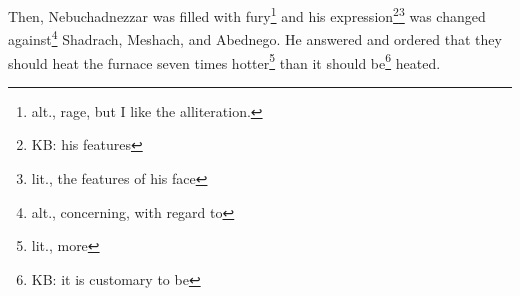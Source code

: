 \begin{inparaenum}
     Then, Nebuchadnezzar was filled with fury\footnote{alt., rage, but I like the alliteration.} and his expression\footnote{KB: his features}\footnote{lit., the features of his face} was changed against\footnote{alt., concerning, with regard to} Shadrach, Meshach, and Abednego. He answered and ordered that they should heat the furnace seven times hotter\footnote{lit., more} than it should be\footnote{KB: it is customary to be} heated.%
    
    
    
\end{inparaenum}
